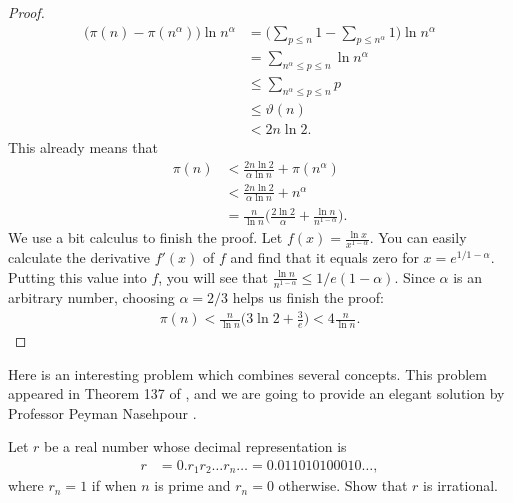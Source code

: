 \begin{proof}
\begin{align*}
				\Big(\pi(n) - \pi(n^{\alpha})\Big) \ln n^{\alpha} &= \Big(\sum_{p \leq n} 1 - \sum_{p \leq n^{
						\alpha}} 1\Big) \ln n^{\alpha}\\
														  &=\sum_{n^{\alpha} \leq p \leq n} \ln n^{\alpha}\\
														  &\leq \sum_{n^{\alpha} \leq p \leq n} p\\
														  &\leq \vartheta(n)\\
														  &< 2n \ln 2.
			\end{align*}
		This already means that
			\begin{align*}
				\pi(n) &< \frac{2n \ln 2}{\alpha \ln n} + \pi(n^{\alpha})\\
					   &< \frac{2n \ln 2}{\alpha \ln n} + n^{\alpha}\\
					   &= \frac{n}{\ln n} \Big(\frac{2 \ln 2}{\alpha} + \frac{\ln n}{n^{1-\alpha}} \Big).
			\end{align*}
		We use a bit calculus to finish the proof. Let $ f(x)=\frac{\ln x}{x^{1-\alpha}}$. You can easily calculate the derivative $f'(x)$ of $f$ and find that it equals zero for $x=e^{1/1-\alpha}$. Putting this value into $f$, you will see that $\frac{\ln n}{n^{1-\alpha}} \leq 1/e(1-\alpha)$. Since $\alpha$ is an arbitrary number, choosing $\alpha = 2/3$ helps us finish the proof:
			\begin{align*}
				\pi(n) < \frac{n}{\ln n} \Big(3 \ln 2 + \frac{3}{e} \Big)< 4 \frac{n}{\ln n}.
			\end{align*}
	\end{proof}


Here is an interesting problem which combines several concepts. This problem appeared in Theorem 137 of \cite{ch:primes-hardy}, and we are going to provide an elegant solution by Professor Peyman Nasehpour \cite{ch:primes-nasehpour}.
\begin{problem}\label{prob:nasehpour}
	Let $r$ be a real number whose decimal representation is
	\begin{align*}
	r & = 0.r_1r_2\ldots r_n \ldots = 0.011010100010\ldots,
	\end{align*}
	where $r_n=1$ if when $n$ is prime and $r_n=0$ otherwise. Show that $r$ is irrational.
\end{problem}

